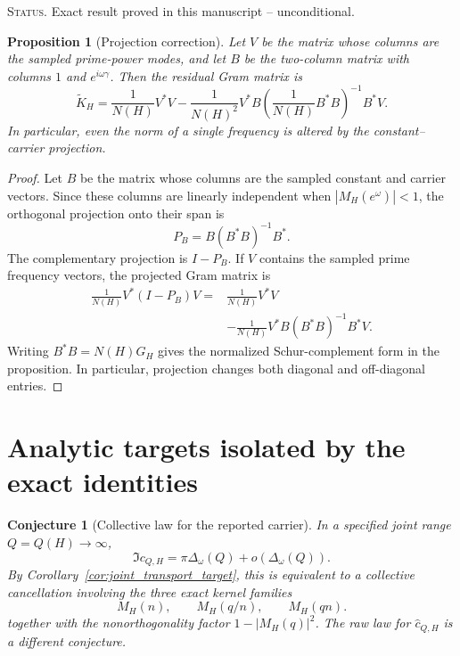 \documentclass[11pt]{amsart}
\numberwithin{equation}{section}
\theoremstyle{plain}
\newtheorem{proposition}[theorem]{Proposition}
\newtheorem{conjecture}[theorem]{Conjecture}
\theoremstyle{definition}
\theoremstyle{remark}
\newcommand{\1}{\mathbf{1}}
\newcommand{\statusnote}[1]{%
  \par\smallskip\noindent
  \begingroup\footnotesize\textsc{Status.} #1\endgroup
  \par\smallskip}
\begin{document}
\statusnote{Exact result proved in this manuscript -- unconditional.}
\begin{proposition}[Projection correction]
\label{prop:projection_correction_detailed}
Let $V$ be the matrix whose columns are the sampled prime-power modes, and
let $B$ be the two-column matrix with columns $1$ and $e^{i\omega\gamma}$.
Then the residual Gram matrix is
\begin{equation}
\widetilde K_H
=
\frac1{N(H)}V^\ast V
-
\frac1{N(H)^2}
V^\ast B
\left(\frac1{N(H)}B^\ast B\right)^{-1}
B^\ast V.
\label{eq:matrix_schur_projection}
\end{equation}
In particular, even the norm of a single frequency is altered by the
constant--carrier projection.
\end{proposition}

\begin{proof}
Let \(B\) be the matrix whose columns are the sampled constant and carrier
vectors.  Since these columns are linearly independent when
\(|M_H(e^\omega)|<1\), the orthogonal projection onto their span is
\begin{equation}
P_B=B(B^\ast B)^{-1}B^\ast.
\label{eq:projection_PB_detailed}
\end{equation}
The complementary projection is \(I-P_B\).  If \(V\) contains the sampled
prime frequency vectors, the projected Gram matrix is
\begin{align}
\frac1{N(H)}V^\ast(I-P_B)V
={}&
\frac1{N(H)}V^\ast V
\label{eq:projection_gram_one}
\\
&-
\frac1{N(H)}V^\ast B(B^\ast B)^{-1}B^\ast V.
\label{eq:projection_gram_two}
\end{align}
Writing \(B^\ast B=N(H)G_H\) gives the normalized Schur-complement form in
the proposition.  In particular, projection changes both diagonal and
off-diagonal entries.
\end{proof}

\section{Analytic targets isolated by the exact identities}
\label{sec:analytic_targets}

\begin{conjecture}[Collective law for the reported carrier]
\label{conj:collective_carrier_law}
In a specified joint range \(Q=Q(H)\to\infty\),
\begin{equation}
\Im c_{Q,H}
=
\pi\Delta_\omega(Q)
+
o\left(\Delta_\omega(Q)\right).
\label{eq:collective_carrier_law}
\end{equation}
By Corollary~\ref{cor:joint_transport_target}, this is equivalent to a
collective cancellation involving the three exact kernel families
\begin{equation}
M_H(n),\qquad M_H(q/n),\qquad M_H(qn).
\label{eq:three_joint_kernel_families}
\end{equation}
together with the nonorthogonality factor
\(1-|M_H(q)|^2\).  The raw law for \(\widehat c_{Q,H}\) is a different
conjecture.
\end{conjecture}
\end{document}
